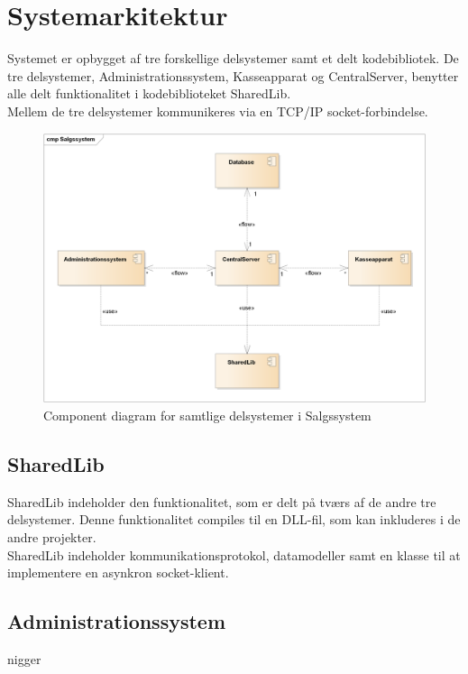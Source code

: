 \section{Systemarkitektur}

Systemet er opbygget af tre forskellige delsystemer samt et delt kodebibliotek. De tre delsystemer, Administrationssystem, Kasseapparat og CentralServer, benytter alle delt funktionalitet i kodebiblioteket SharedLib.\\

Mellem de tre delsystemer kommunikeres via en TCP/IP socket-forbindelse.


\begin{figure}[H]
    \centering
    \includegraphics[width=1\textwidth]{Projektbeskrivelse/Systemarkitektur/Components.png}
    \caption{Component diagram for samtlige delsystemer i Salgssystem}
    \label{fig:CSLogging}
\end{figure}



\subsection{SharedLib}
SharedLib indeholder den funktionalitet, som er delt på tværs af de andre tre delsystemer. Denne funktionalitet compiles til en DLL-fil, som kan inkluderes i de andre projekter.\\

SharedLib indeholder kommunikationsprotokol, datamodeller samt en klasse til at implementere en asynkron socket-klient.


\subsection{Administrationssystem}
nigger


